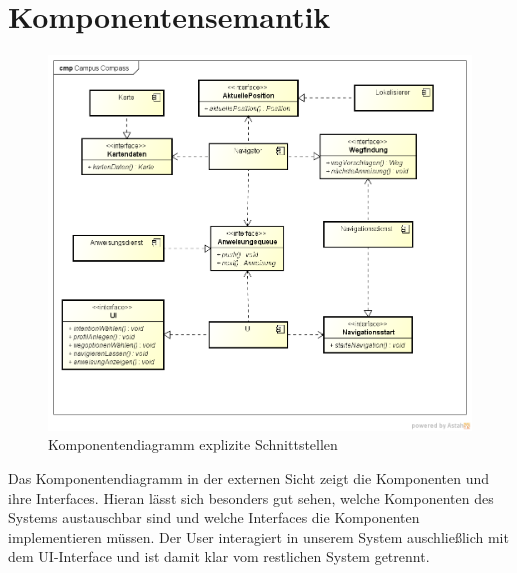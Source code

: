 \chapter{Komponentensemantik}

\begin{figure}[hbt]
  \centering
  \includegraphics[width=\linewidth]{img/komponentendiagramm_neu.png}
  \caption{Komponentendiagramm explizite Schnittstellen}
\end{figure}

Das Komponentendiagramm in der externen Sicht zeigt die Komponenten und ihre
Interfaces. Hieran lässt sich besonders gut sehen, welche Komponenten des
Systems austauschbar sind und welche Interfaces die Komponenten implementieren
müssen. Der User interagiert in unserem System auschließlich mit dem
UI-Interface und ist damit klar vom restlichen System getrennt.
